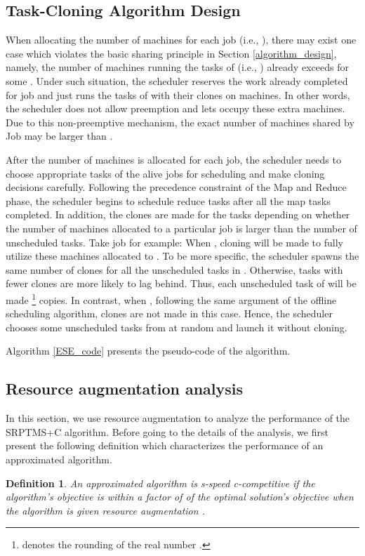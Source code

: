 \documentclass[10pt,conference,compsocconf,letterpaper]{IEEEtran}
\newtheorem{definition}{Definition}
\begin{document}
 \subsection{Task-Cloning Algorithm Design}
When allocating the number of machines for each job (i.e., ), there may exist one case which violates the basic sharing principle in
Section \ref{algorithm_design}, namely, the number of machines running the tasks of  (i.e., ) already exceeds  for some .
Under such situation, the scheduler reserves the work already completed for job  and just runs the tasks of  with their clones on  machines. 
In other words,
the scheduler does not allow preemption and lets  occupy these extra machines.
Due to this non-preemptive mechanism, the exact number of machines shared by Job  may be larger than .

After the number of machines is allocated for each job, the scheduler needs to choose appropriate tasks of the alive jobs for scheduling and make cloning decisions carefully. Following the precedence  constraint of the Map and Reduce phase, the scheduler begins to schedule reduce tasks after all the map tasks completed. In addition, the clones are made for the tasks depending on whether the number of machines allocated to a particular job is larger than the number of unscheduled tasks.  Take job  for example: When , cloning will be made to fully utilize these machines allocated  to . To be more specific, the scheduler spawns the same number of clones for all the unscheduled tasks in . Otherwise, tasks with fewer clones are more likely to lag behind. Thus, each unscheduled task of  will be made  \footnote{ denotes the rounding of the real number .} copies. 
In contrast, when , following the same argument of the offline scheduling algorithm, clones are not made in this case. Hence, the scheduler chooses some unscheduled tasks from  at random and launch it without cloning.  

Algorithm \ref{ESE_code} presents the pseudo-code of the algorithm.


\subsection{Resource augmentation analysis}
In this section, we use resource augmentation to analyze the performance of the SRPTMS+C algorithm.
Before going to the details of the analysis,
we first present the following definition which characterizes the performance of an approximated algorithm.

\begin{definition}
An approximated algorithm is \textit{s-speed c-competitive} if the algorithm's objective is within a factor of 
of the optimal solution's objective when the algorithm is given  resource augmentation \cite{speedis}.
\end{definition}
\end{document}
